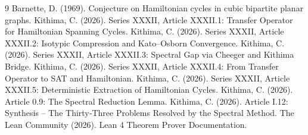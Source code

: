 \documentclass[11pt,a4paper]{article}
\begin{document}

\begin{thebibliography}{9}
  Barnette, D. (1969). Conjecture on Hamiltonian cycles in cubic bipartite planar graphs.
  Kithima, C. (2026). Series XXXII, Article XXXII.1: Transfer Operator for Hamiltonian Spanning Cycles.
  Kithima, C. (2026). Series XXXII, Article XXXII.2: Isotypic Compression and Kato–Osborn Convergence.
  Kithima, C. (2026). Series XXXII, Article XXXII.3: Spectral Gap via Cheeger and Kithima Bridge.
  Kithima, C. (2026). Series XXXII, Article XXXII.4: From Transfer Operator to SAT and Hamiltonian.
  Kithima, C. (2026). Series XXXII, Article XXXII.5: Deterministic Extraction of Hamiltonian Cycles.
  Kithima, C. (2026). Article 0.9: The Spectral Reduction Lemma.
  Kithima, C. (2026). Article I.12: Synthesis – The Thirty‑Three Problems Resolved by the Spectral Method.
  The Lean Community (2026). Lean 4 Theorem Prover Documentation.
\end{thebibliography}
\end{document}
